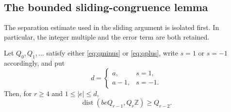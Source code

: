 \subsection{The bounded sliding-congruence lemma}

The separation estimate used in the sliding argument is isolated first.  In
particular, the integer multiple and the error term are both retained.

\begin{lemma}
\label{lem:nearest-multiple-separation}
Let $Q_0,Q_1,\ldots$ satisfy either \eqref{eq:qminus} or \eqref{eq:qplus},
write $s=1$ or $s=-1$ accordingly, and put
\[
d=\begin{cases}a,&s=1,\\a-1,&s=-1.\end{cases}
\]
Then, for $r\ge4$ and $1\le |e|\le d$,
\begin{equation}
\operatorname{dist}(beQ_{r-1},Q_r\mathbb Z)\ge Q_{r-2}.
\label{eq:quadratic-separation}
\end{equation}
\end{lemma}

